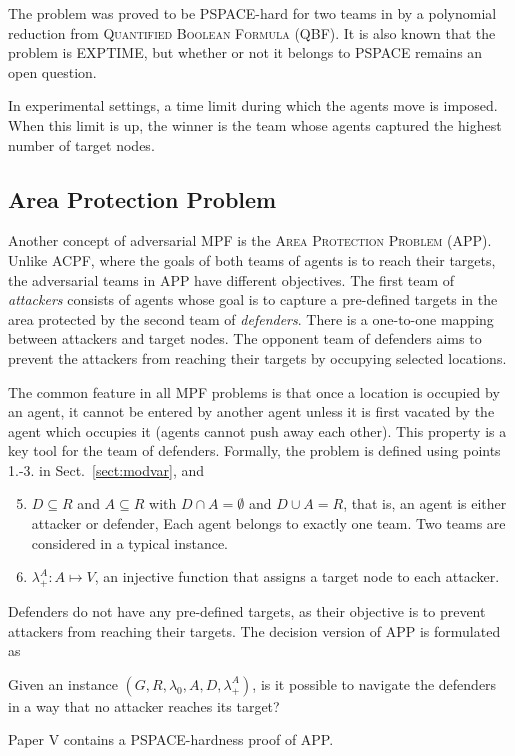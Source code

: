 The problem was proved to be PSPACE-hard for two teams in \cite{ivanova14} by a polynomial reduction from \textsc{Quantified Boolean Formula} (QBF).
It is also known that the problem is EXPTIME, but whether or not it belongs to PSPACE remains an open question.

In experimental settings, a time limit during which the agents move is imposed.
When this limit is up, the winner is the team whose agents captured the highest number of target nodes.

\subsection{Area Protection Problem}

Another concept of adversarial MPF is the \textsc{Area Protection Problem} (APP).
Unlike ACPF, where the goals of both teams of agents is to reach their targets, the adversarial teams in APP have different objectives. 
The first team of \emph{attackers} consists of agents whose goal is to capture a pre-defined targets in the area protected by the second team of \emph{defenders}. 
There is a one-to-one mapping between attackers and target nodes.
The opponent team of defenders aims to prevent the attackers from reaching their targets by occupying selected locations.

The common feature in all MPF problems is that once a location is occupied by an agent, 
it cannot be entered by another agent unless it is first vacated by the agent which occupies it (agents cannot push away each other). 
This property is a key tool for the team of defenders.
Formally, the problem is defined using points 1.-3. in Sect.~\ref{sect:modvar}, and
\begin{enumerate}
	\setcounter{enumi}{4}
	\item $D\subseteq R$ and $A\subseteq R$ with $D\cap A=\emptyset$ and $D\cup A=R$, that is, an agent is either attacker or defender,
		Each agent belongs to exactly one team. 
		Two teams are considered in a typical instance. 
	\item $\lambda_+^A:A\mapsto V$, an injective function that assigns a target node to each attacker.
\end{enumerate}

Defenders do not have any pre-defined targets, as their objective is to prevent attackers from reaching their targets.
The decision version of APP is formulated as 
\begin{problem}\label{prob:app}
	Given an instance $(G,R,\lambda_0,A, D, \lambda_+^A)$, is it possible to navigate the defenders in a way that no attacker reaches its target?
\end{problem}
Paper V \cite{ivanova18a} contains a PSPACE-hardness proof of APP.

